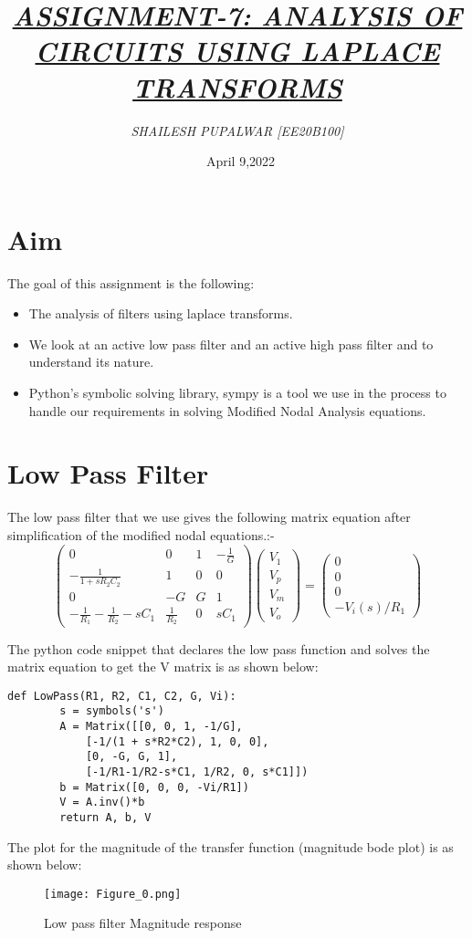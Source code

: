\documentclass[11pt, a4paper]{article}
\title{\underline{\textit{\Large{ASSIGNMENT-7: ANALYSIS OF CIRCUITS USING LAPLACE TRANSFORMS}}}}
\author{\textit{SHAILESH PUPALWAR [EE20B100]}}
\date{\ April 9,2022}
\begin{document}
\maketitle

\section*{Aim}
The goal of this assignment is the following:
\begin{itemize}
\item The analysis of filters using laplace transforms.
\item We look at an active low pass filter and an active high pass filter and to understand its nature.
\item Python’s  symbolic  solving  library,  sympy  is  a  tool  we  use  in  the  process  to handle our requirements in solving Modified Nodal Analysis equations. 

\end{itemize}

\section*{Low Pass Filter}
The low pass filter that we use gives the following matrix equation after simplification of the modified nodal equations.:-
\[\begin{pmatrix} 0 & 0 & 1 & -\frac{1}{G} \\ -\frac{1}{1+sR_2C_2} & 1 & 0 & 0 \\ 0 & -G & G & 1 \\ -\frac{1}{R_1}-\frac{1}{R_2}-sC_1 & \frac{1}{R_2} & 0 & sC_1 \end{pmatrix}\begin{pmatrix} V_1 \\ V_p \\ V_m \\ V_o \end{pmatrix} = \begin{pmatrix} 0 \\ 0 \\ 0 \\ -V_i(s)/R_1 \end{pmatrix}\]

The python code snippet that declares the low pass function and solves the matrix equation to get the V matrix is as shown below:
\begin{verbatim}
def LowPass(R1, R2, C1, C2, G, Vi):
    	s = symbols('s')
    	A = Matrix([[0, 0, 1, -1/G],
    		[-1/(1 + s*R2*C2), 1, 0, 0],
    		[0, -G, G, 1],
    		[-1/R1-1/R2-s*C1, 1/R2, 0, s*C1]])
    	b = Matrix([0, 0, 0, -Vi/R1])
    	V = A.inv()*b
    	return A, b, V
\end{verbatim}
The plot for the magnitude of the transfer function (magnitude bode plot) is as shown below:
\begin{figure}[!tbh]
   	\centering
   	\texttt{[image: Figure\_0.png]}
   	\label{fig:32}
   	\caption{Low pass filter Magnitude response}
   \end{figure}
\end{document}
